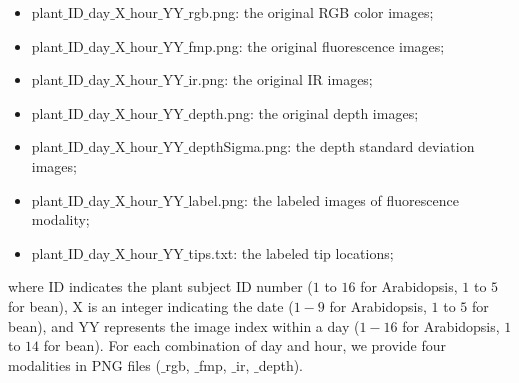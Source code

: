 \begin{itemize}
\item plant$\_$ID$\_$day$\_$X$\_$hour$\_$YY$\_$rgb.png: the original RGB color images;
\item plant$\_$ID$\_$day$\_$X$\_$hour$\_$YY$\_$fmp.png: the original fluorescence images;
\item plant$\_$ID$\_$day$\_$X$\_$hour$\_$YY$\_$ir.png: the original IR images;
\item plant$\_$ID$\_$day$\_$X$\_$hour$\_$YY$\_$depth.png: the original depth images;
\item plant$\_$ID$\_$day$\_$X$\_$hour$\_$YY$\_$depthSigma.png: the depth standard deviation images;
\item plant$\_$ID$\_$day$\_$X$\_$hour$\_$YY$\_$label.png: the labeled images of fluorescence modality;
\item plant$\_$ID$\_$day$\_$X$\_$hour$\_$YY$\_$tips.txt: the labeled tip locations;
\end{itemize}
where ID indicates the plant subject ID number ($1$ to $16$ for Arabidopsis, $1$ to $5$ for bean), X is an integer indicating the date ($1-9$ for Arabidopsis, $1$ to $5$ for bean), and YY represents the image index within a day ($1-16$ for Arabidopsis, $1$ to $14$ for bean).
For each combination of day and hour, we provide four modalities in PNG files ($\_$rgb, $\_$fmp, $\_$ir, $\_$depth).
